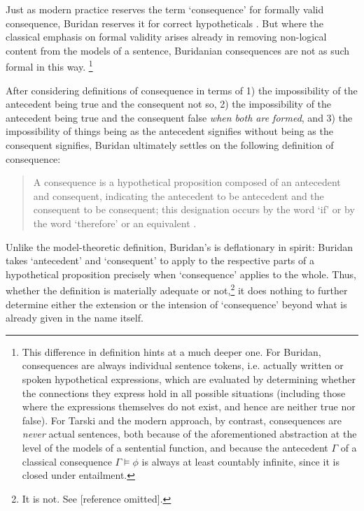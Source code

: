 \documentclass[]{article}
\begin{document}
Just as modern practice reserves the term `consequence' for formally valid consequence, Buridan reserves it for correct hypotheticals \autocite[I. 3, 66]{Buridan2015}. But where the classical emphasis on formal validity arises already in removing non-logical content from the models of a sentence, Buridanian consequences are not as such formal in this way. \footnote{This difference in definition hints at a much deeper one. For Buridan, consequences are always individual sentence tokens, i.e. actually written or spoken hypothetical expressions, which are evaluated by determining whether the connections they express hold in all possible situations (including those where the expressions themselves do not exist, and hence are neither true nor false). For Tarski and the modern approach, by contrast, consequences are \textit{never} actual sentences, both because of the aforementioned abstraction at the level of the models of a sentential function, and because the antecedent $\Gamma$ of a classical consequence $\Gamma \models \phi$ is always at least countably infinite, since it is closed under entailment.}


After considering definitions of consequence in terms of 1) the impossibility of the antecedent being true and the consequent not so, 2) the impossibility of the antecedent being true and the consequent false \textit{when both are formed}, and 3) the impossibility of things being as the antecedent signifies without being as the consequent signifies, Buridan ultimately settles on the following definition of consequence: 

\begin{quote}
	A consequence is a hypothetical proposition composed of an antecedent and consequent, indicating the antecedent to be antecedent and the consequent to be consequent; this designation occurs by the word `if' or by the word `therefore' or an equivalent \autocite[I. 3, 67]{Buridan2015}.
\end{quote}

Unlike the model-theoretic definition, Buridan's is deflationary in spirit: Buridan takes `antecedent' and `consequent' to apply to the respective parts of a hypothetical proposition precisely when `consequence' applies to the whole. Thus, whether the definition is materially adequate or not,\footnote{It is not. See [reference omitted].} it does nothing to further determine either the extension or the intension of `consequence' beyond what is already given in the name itself.
\end{document}
